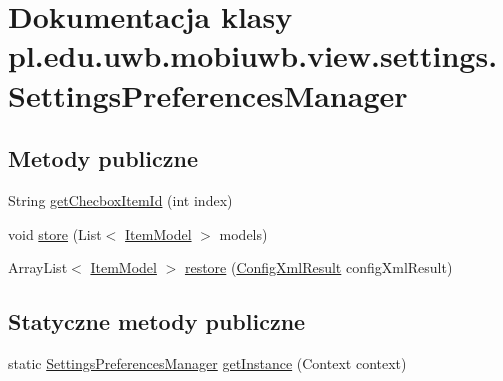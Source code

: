 \hypertarget{classpl_1_1edu_1_1uwb_1_1mobiuwb_1_1view_1_1settings_1_1_settings_preferences_manager}{}\section{Dokumentacja klasy pl.\+edu.\+uwb.\+mobiuwb.\+view.\+settings.\+Settings\+Preferences\+Manager}
\label{classpl_1_1edu_1_1uwb_1_1mobiuwb_1_1view_1_1settings_1_1_settings_preferences_manager}
\subsection*{Metody publiczne}
\begin{DoxyCompactItemize}
\item 
String \hyperlink{classpl_1_1edu_1_1uwb_1_1mobiuwb_1_1view_1_1settings_1_1_settings_preferences_manager_abc0a86bdc9bb50200f33dc177824d3be}{get\+Checbox\+Item\+Id} (int index)
\item 
void \hyperlink{classpl_1_1edu_1_1uwb_1_1mobiuwb_1_1view_1_1settings_1_1_settings_preferences_manager_a529308f6dffc34f669b0877968e45538}{store} (List$<$ \hyperlink{classpl_1_1edu_1_1uwb_1_1mobiuwb_1_1view_1_1settings_1_1adapter_1_1items_1_1_item_model}{Item\+Model} $>$ models)
\item 
Array\+List$<$ \hyperlink{classpl_1_1edu_1_1uwb_1_1mobiuwb_1_1view_1_1settings_1_1adapter_1_1items_1_1_item_model}{Item\+Model} $>$ \hyperlink{classpl_1_1edu_1_1uwb_1_1mobiuwb_1_1view_1_1settings_1_1_settings_preferences_manager_a5f12fb1c3dcbe39bc5521d4c8207b0f0}{restore} (\hyperlink{classpl_1_1edu_1_1uwb_1_1mobiuwb_1_1parsers_1_1xml_1_1parser_1_1_config_xml_result}{Config\+Xml\+Result} config\+Xml\+Result)
\end{DoxyCompactItemize}
\subsection*{Statyczne metody publiczne}
\begin{DoxyCompactItemize}
\item 
static \hyperlink{classpl_1_1edu_1_1uwb_1_1mobiuwb_1_1view_1_1settings_1_1_settings_preferences_manager}{Settings\+Preferences\+Manager} \hyperlink{classpl_1_1edu_1_1uwb_1_1mobiuwb_1_1view_1_1settings_1_1_settings_preferences_manager_aa56898e37fbd5a6221f81e7d626c137c}{get\+Instance} (Context context)
\end{DoxyCompactItemize}
